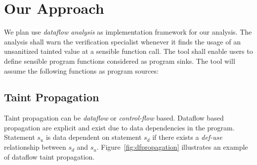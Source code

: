 \section{Our Approach}

We plan use \textit{dataflow analysis} as implementation
framework for our analysis. 
The analysis shall warn the verification specialist
whenever it finds the usage of an unsanitized tainted value
at a sensible function call. The tool shall enable users
to define sensible program functions considered as program
sinks. The tool will assume the following functions as
program sources: 




\subsection{Taint Propagation}\label{analysis:propagation}
\begin{comment}
\begin{table}[h!]
\begin{center}
  \begin{tabular}{|l|c|c|}
  \hline
  Operations 				& 	Tainted Source Input	&	Target Tainted Input	\\ \hline
  $rStr = tStr$				&	$tStr$					&	$rStr$					\\ \hline
  $rStr = tStr + someStr$	& 	$tStr$					&	$rStr$					\\ \hline
  \end{tabular}
  \caption{Excerpt of Taint Propagation Rules}\label{analysis:propagation:t1}
\end{center}
\end{table}	
\end{comment}



Taint propagation can be \textit{dataflow} or \textit{control-flow} based.
Dataflow based propagation are explicit and exist due to data
dependencies in the program. Statement $s_u$ is data dependent
on statement $s_d$ if there exists a \textit{def-use} relationship
between $s_d$ and $s_u$. Figure~\ref{fig:dfpropagation} illustrates
an example of dataflow taint propagation. 

